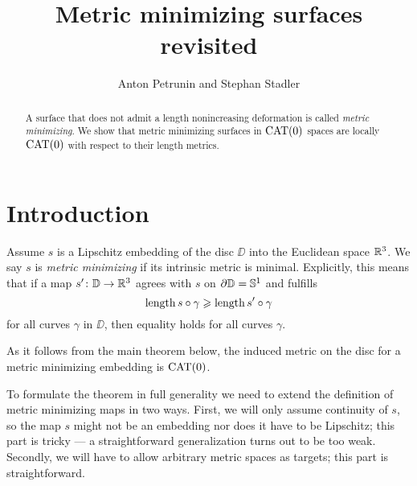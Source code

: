 \documentclass{article}
\begin{document}
\title{Metric minimizing surfaces revisited}
\author{Anton Petrunin and Stephan Stadler}

\newcommand{\Addresses}{{\bigskip\footnotesize
Anton Petrunin, \par\nopagebreak\textsc{Department of Mathematics, PSU, University Park, PA 16802, USA}
\par\nopagebreak
\textit{Email}: \texttt{petrunin@math.psu.edu}

\medskip
 
Stephan Stadler,
\par\nopagebreak\textsc{Mathematisches Institut der Universit\"at M\"unchen, Theresienstr. 39, D-80333 M\"unchen, Germany}
\par\nopagebreak
\textit{Email}: \texttt{stadler@math.lmu.de}
}}

\date{}


\maketitle

\begin{abstract}
A surface that does not admit a length nonincreasing deformation is called \emph{metric minimizing}.
We show that metric minimizing surfaces in $\mathop{\rm CAT}\nolimits(0)$ spaces are locally $\mathop{\rm CAT}\nolimits(0)$ with respect to their length metrics. 
\end{abstract}

\section{Introduction}


Assume $s$ is a Lipschitz embedding of the disc $\DD$ into the Euclidean space $\mathbb{R}^3$.
We say $s$ is \emph{metric minimizing} if its intrinsic metric is minimal. Explicitly, this means that if a map $s'\colon\mathbb{D}\to \mathbb{R}^3$ agrees with 
$s$ on $\partial \mathbb{D}=\mathbb{S}^1$ and fulfills 
\[\mathop{\rm length}\nolimits s\circ\gamma\geqslant \mathop{\rm length}\nolimits s'\circ\gamma\]
for all curves $\gamma$ in $\DD$, then equality holds for all curves $\gamma$.

As it follows from the main theorem below, the induced metric on the disc for a metric minimizing embedding is $\mathop{\rm CAT}\nolimits(0)$.

To formulate the theorem in full generality we need to extend the definition of metric minimizing maps in two ways.
First, we will only assume continuity of $s$, so the map $s$ might not be an embedding nor does it have to be Lipschitz;
this part is tricky --- a straightforward generalization turns out to be too weak.
Secondly, we will have to allow arbitrary metric spaces as targets; this part is straightforward. 
\end{document}
